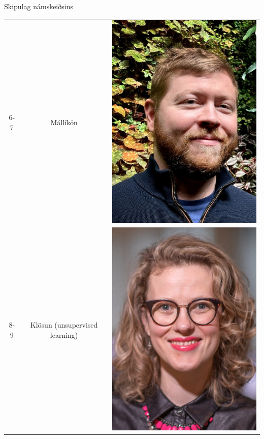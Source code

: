 \documentclass[
    NAME={Dr. Helga Ingimundardóttir},
    EMAIL={helgaingim@hi.is},
    FACULTY={Iðnaðarverkfræði},
    TITLE={Hagnýt hæfni í brennidepli},
    SUBTITLE={Endurskoðun á námskeiði í Viðskiptagreind},
    SEMINAR={Ráðstefna kennsluakademíunnar},
    DATE={22 nóvember, 2024},
    WIDE={true},
    ICELANDIC={true}
]{HI-LaTeX/hi-beamer}
\begin{document}
\begin{frame}{Skipulag námskeiðsins}
\begin{table}
\begin{tabular}{ccc}
            6-7 & Mállíkön                                   & \includegraphics[height=.08\textheight]{figures/hafsteinne} \\
            8-9 & Klösun (unsupervised learning) & \includegraphics[height=.08\textheight]{figures/helgaingim} \\

\end{tabular}
\end{table}
\end{frame}
\end{document}
